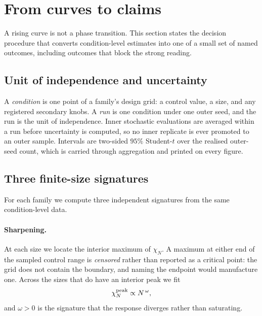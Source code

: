 \section{From curves to claims}
\label{sec:gates}

A rising curve is not a phase transition. This section states the decision
procedure that converts condition-level estimates into one of a small set of
named outcomes, including outcomes that block the strong reading.

\subsection{Unit of independence and uncertainty}

A \emph{condition} is one point of a family's design grid: a control value, a
size, and any registered secondary knobs. A \emph{run} is one condition under
one outer seed, and the run is the unit of independence. Inner stochastic
evaluations are averaged within a run before uncertainty is computed, so no
inner replicate is ever promoted to an outer sample. Intervals are two-sided
$95\%$ Student-$t$ over the realised outer-seed count, which is carried through
aggregation and printed on every figure.

\subsection{Three finite-size signatures}

For each family we compute three independent signatures from the same
condition-level data.

\paragraph{Sharpening.} At each size we locate the interior maximum of
$\chi_N$. A maximum at either end of the sampled control range is
\emph{censored} rather than reported as a critical point: the grid does not
contain the boundary, and naming the endpoint would manufacture one. Across the
sizes that do have an interior peak we fit
\begin{equation}
  \chi_N^{\rm peak}\propto N^{\,\omega},
  \label{eq:sharpening}
\end{equation}
and $\omega>0$ is the signature that the response diverges rather than
saturating.

